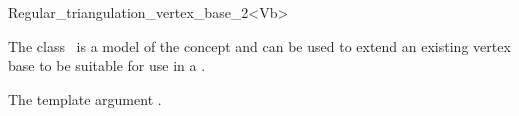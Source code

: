 \begin{ccRefClass}{Regular_triangulation_vertex_base_2<Vb>}

\ccDefinition The class \ccRefName\ is a model of the concept
 and can be used
to extend an existing vertex base to be suitable for use in a .

\ccInheritsFrom
The template argument .

\end{ccRefClass}
